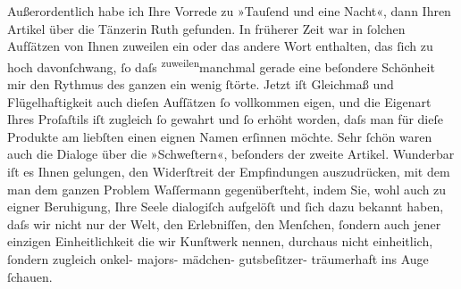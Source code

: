 \begin{ledgroupsized}[t]{13cm}
               Außerordentlich habe ich Ihre Vorrede zu »Tauſend und eine Nacht«,
               dann Ihren Artikel über die
               Tänzerin Ruth gefunden. In früherer Zeit war
               in ſolchen Aufſätzen von Ihnen zuweilen ein oder das andere Wort enthalten, das ſich
               zu hoch davonſchwang, ſo daſs \substVorne{}\textsuperscript{zuweilen}{\allowbreak}\substDazwischen{}manchmal\substHinten{} gerade eine beſondere Schönheit mir den Rythmus des ganzen ein wenig ſtörte.
               Jetzt iſt Gleichmaß und {\pb}Flügelhaftigkeit auch dieſen
               Aufſätzen ſo vollkommen eigen,  und die
               Eigenart  Ihres Proſaſtils iſt zugleich ſo gewahrt
               und ſo erhöht worden, daſs man für dieſe Produkte am liebſten einen eignen Namen
               erſinnen möchte. Sehr ſchön waren auch die Dialoge über die »Schweſtern«, beſonders der zweite Artikel. Wunderbar iſt es Ihnen gelungen,
               den Widerſtreit der Empfindungen auszudrücken, mit dem man dem ganzen Problem {\pb}Waſſermann gegenüberſteht, indem Sie, wohl
               auch zu eigner Beruhigung, Ihre Seele dialogiſch aufgelöſt und ſich dazu bekannt
               haben, daſs wir nicht nur der Welt, den Erlebniſſen, den Menſchen, ſondern auch jener
               einzigen Einheitlichkeit die wir Kunſtwerk nennen, durchaus nicht einheitlich,
               ſondern zugleich onkel- majors- mädchen- gutsbeſitzer- träumerhaft ins Auge ſchauen.

\end{ledgroupsized}
